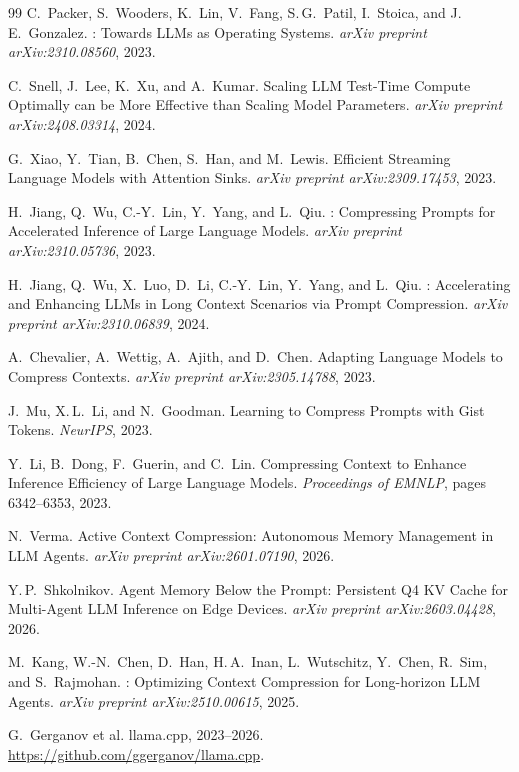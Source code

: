 \documentclass[11pt,a4paper]{article}
\begin{document}
\begin{thebibliography}{99}
C.~Packer, S.~Wooders, K.~Lin, V.~Fang, S.\,G.~Patil, I.~Stoica, and J.\,E.~Gonzalez.
: Towards {LLM}s as Operating Systems.
\newblock \emph{arXiv preprint arXiv:2310.08560}, 2023.

C.~Snell, J.~Lee, K.~Xu, and A.~Kumar.
\newblock Scaling {LLM} Test-Time Compute Optimally can be More Effective than Scaling Model Parameters.
\newblock \emph{arXiv preprint arXiv:2408.03314}, 2024.

G.~Xiao, Y.~Tian, B.~Chen, S.~Han, and M.~Lewis.
\newblock Efficient Streaming Language Models with Attention Sinks.
\newblock \emph{arXiv preprint arXiv:2309.17453}, 2023.

H.~Jiang, Q.~Wu, C.-Y.~Lin, Y.~Yang, and L.~Qiu.
: Compressing Prompts for Accelerated Inference of Large Language Models.
\newblock \emph{arXiv preprint arXiv:2310.05736}, 2023.

H.~Jiang, Q.~Wu, X.~Luo, D.~Li, C.-Y.~Lin, Y.~Yang, and L.~Qiu.
: Accelerating and Enhancing {LLM}s in Long Context Scenarios via Prompt Compression.
\newblock \emph{arXiv preprint arXiv:2310.06839}, 2024.

A.~Chevalier, A.~Wettig, A.~Ajith, and D.~Chen.
\newblock Adapting Language Models to Compress Contexts.
\newblock \emph{arXiv preprint arXiv:2305.14788}, 2023.

J.~Mu, X.\,L.~Li, and N.~Goodman.
\newblock Learning to Compress Prompts with Gist Tokens.
\newblock \emph{NeurIPS}, 2023.

Y.~Li, B.~Dong, F.~Guerin, and C.~Lin.
\newblock Compressing Context to Enhance Inference Efficiency of Large Language Models.
\newblock \emph{Proceedings of EMNLP}, pages 6342--6353, 2023.

N.~Verma.
\newblock Active Context Compression: Autonomous Memory Management in {LLM} Agents.
\newblock \emph{arXiv preprint arXiv:2601.07190}, 2026.

Y.\,P.~Shkolnikov.
\newblock Agent Memory Below the Prompt: Persistent {Q4} {KV} Cache for Multi-Agent {LLM} Inference on Edge Devices.
\newblock \emph{arXiv preprint arXiv:2603.04428}, 2026.

M.~Kang, W.-N.~Chen, D.~Han, H.\,A.~Inan, L.~Wutschitz, Y.~Chen, R.~Sim, and S.~Rajmohan.
: Optimizing Context Compression for Long-horizon {LLM} Agents.
\newblock \emph{arXiv preprint arXiv:2510.00615}, 2025.

G.~Gerganov et al.
\newblock llama.cpp, 2023--2026.
\newblock \url{https://github.com/ggerganov/llama.cpp}.
\end{thebibliography}
\end{document}
